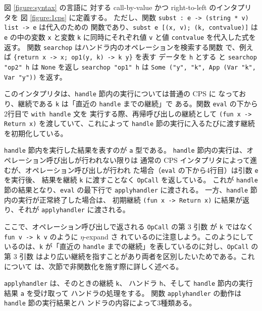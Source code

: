 図 \ref{figure:syntax} の言語に
対する call-by-value かつ right-to-left のインタプリタを
図 \ref{figure:1cps} に定義する。
ただし、関数 \texttt{subst :\ e -> (string * v) list -> e} は代入のための
関数であり、\texttt{subst e [(x, v); (k, cont\US{}value)]} は \texttt{e}
の中の変数 \texttt{x} と変数 \texttt{k} に同時にそれぞれ値 \texttt{v}
と値 \texttt{cont\US{}value} を代入した式を返す。
関数 \texttt{search\US{}op} はハンドラ内のオペレーションを検索する関数
で、例えば \texttt{\{return x -> x; op1(y, k) -> k y\}} を表す
データを \texttt{h} とする
と \texttt{search\US{}op "op2" h} は \texttt{None} を返し
\texttt{search\US{}op "op1" h} は \texttt{Some ("y", "k", App (Var "k", Var
"y"))} を返す。

このインタプリタは、\texttt{handle} 節内の実行については普通の CPS に
なっており、継続である \texttt{k} は「直近の \texttt{handle} までの継続」で
ある。関数 \texttt{eval} の下から2行目で \texttt{with handle} 文を
実行する際、再帰呼び出しの継続として
\texttt{(fun x -> Return x)} を渡していて、これによって
\texttt{handle} 節の実行に入るたびに渡す継続を初期化している。


\texttt{handle} 節内を実行した結果を表すのが \texttt{a} 型である。
\texttt{handle} 節内の実行は、オペレーション呼び出しが行われない限りは
通常の CPS インタプリタによって進むが、オペレーション呼び出しが行われ
た場合（\texttt{eval} の下から4行目）は引数 \texttt{e} を実行後、
結果を継続 \texttt{k} に渡すことなく \texttt{OpCall} を返している。
これが \texttt{handle} 節の結果となり、\texttt{eval} の最下行で
\texttt{apply\US{}handler} に渡される。
一方、\texttt{handle} 節内の実行が正常終了した場合は、
初期継続 \texttt{(fun x -> Return x)} に結果が返り、それが
\texttt{apply\US{}handler} に渡される。

ここで、オペレーション呼び出しで返される \texttt{OpCall} の第 3 引数
が \texttt{k} ではなく \texttt{fun v -> k v} のように $\eta$-expand さ
れているのに注意しよう。このようにしているのは、\texttt{k} が「直近の
\texttt{handle} までの継続」を表しているのに対し、\texttt{OpCall} の第 3 引数
はより広い継続を指すことがあり両者を区別したいためである。これについて
は、次節で非関数化を施す際に詳しく述べる。

\texttt{apply\US{}handler} は、そのときの継続 \texttt{k}、
ハンドラ \texttt{h}、そして
\texttt{handle} 節内の実行結果 \texttt{a} を受け取って
ハンドラの処理をする。
関数 \texttt{apply\US{}handler} の動作は \texttt{handle} 節の実行結果とハ
ンドラの内容によって3種類ある。

